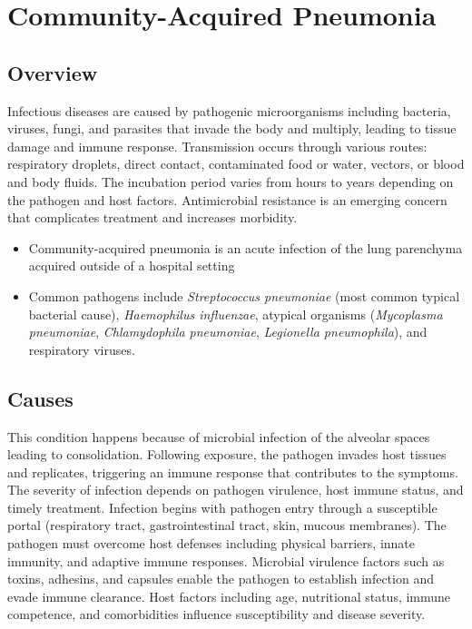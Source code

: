 \chapter{Community-Acquired Pneumonia}
\label{sec:Community-Acquired Pneumonia}

\section{Overview}
Infectious diseases are caused by pathogenic microorganisms including bacteria, viruses, fungi, and parasites that invade the body and multiply, leading to tissue damage and immune response. Transmission occurs through various routes: respiratory droplets, direct contact, contaminated food or water, vectors, or blood and body fluids. The incubation period varies from hours to years depending on the pathogen and host factors. Antimicrobial resistance is an emerging concern that complicates treatment and increases morbidity.

\begin{itemize}[noitemsep]
  \item Community-acquired pneumonia is an acute infection of the lung parenchyma acquired outside of a hospital setting
  \item Common pathogens include \textit{Streptococcus pneumoniae} (most common typical bacterial cause), \textit{Haemophilus influenzae}, atypical organisms (\textit{Mycoplasma pneumoniae}, \textit{Chlamydophila pneumoniae}, \textit{Legionella pneumophila}), and respiratory viruses.
\end{itemize}
\section{Causes}
This condition happens because of microbial infection of the alveolar spaces leading to consolidation. Following exposure, the pathogen invades host tissues and replicates, triggering an immune response that contributes to the symptoms. The severity of infection depends on pathogen virulence, host immune status, and timely treatment. Infection begins with pathogen entry through a susceptible portal (respiratory tract, gastrointestinal tract, skin, mucous membranes). The pathogen must overcome host defenses including physical barriers, innate immunity, and adaptive immune responses. Microbial virulence factors such as toxins, adhesins, and capsules enable the pathogen to establish infection and evade immune clearance. Host factors including age, nutritional status, immune competence, and comorbidities influence susceptibility and disease severity.
